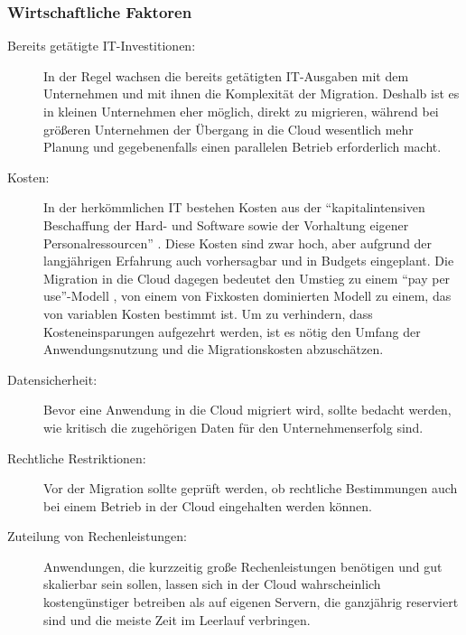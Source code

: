 \subsubsection{Wirtschaftliche Faktoren}
\begin{description}
	\item[Bereits getätigte IT-Investitionen:]
	In der Regel wachsen die bereits getätigten IT-Ausgaben mit dem
Unternehmen und mit ihnen die Komplexität der Migration. Deshalb ist es in
kleinen Unternehmen eher möglich, direkt zu migrieren, während bei
größeren Unternehmen der Übergang in die Cloud wesentlich mehr Planung und
gegebenenfalls einen parallelen Betrieb erforderlich macht.

	\item[Kosten:] In der herkömmlichen IT bestehen Kosten aus der
"`kapitalintensiven Beschaffung der Hard- und Software sowie der Vorhaltung
eigener Personalressourcen"' . Diese Kosten sind
zwar hoch, aber aufgrund der langjährigen Erfahrung auch vorhersagbar und in
Budgets eingeplant. Die Migration in die Cloud dagegen bedeutet den Umstieg zu
einem "`pay per use"'-Modell , von einem
von Fixkosten dominierten Modell zu einem, das von variablen Kosten bestimmt
ist.
Um zu verhindern, dass Kosteneinsparungen aufgezehrt werden, ist es nötig
den Umfang der Anwendungsnutzung und die Migrationskosten abzuschätzen.


	\item[Datensicherheit:] Bevor eine Anwendung in die Cloud migriert
wird, sollte bedacht werden, wie kritisch die zugehörigen Daten für den
Unternehmenserfolg sind.
	\item[Rechtliche Restriktionen:] Vor der Migration sollte geprüft
werden, ob rechtliche Bestimmungen auch bei einem Betrieb in der Cloud
eingehalten werden können.
	\item[Zuteilung von Rechenleistungen:] Anwendungen, die kurzzeitig
große Rechenleistungen benötigen und gut skalierbar sein sollen, lassen sich in
der Cloud wahrscheinlich kostengünstiger betreiben als auf eigenen Servern, die
ganzjährig reserviert sind und die meiste Zeit im Leerlauf verbringen.
\end{description}


